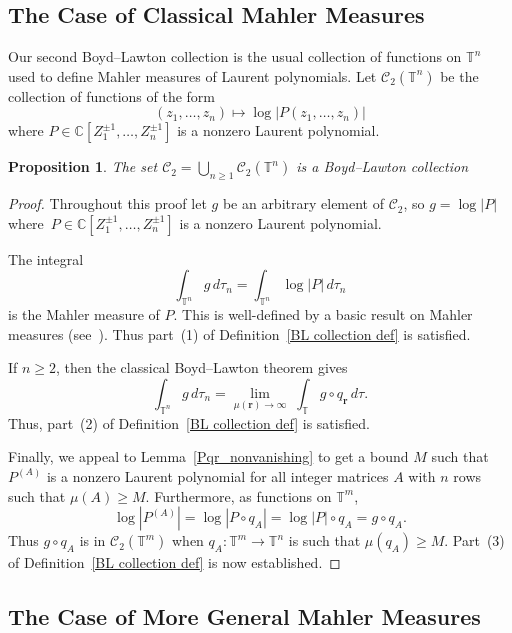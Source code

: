 \documentclass[12pt]{amsart}
\theoremstyle{plain}
\newtheorem{proposition}[theorem]{Proposition}
\theoremstyle{definition}
\theoremstyle{remark}
\numberwithin{theorem}{section}
\numberwithin{equation}{section} %
\newcommand{\bC}{{\mathbb{C}}}
\newcommand{\mc}{\mathcal}
\newcommand{\mb}{\mathbf}
\newcommand{\torus}{{\mathbb{T}}}
\begin{document}


\subsection{The Case of Classical Mahler Measures}

Our second Boyd--Lawton collection is the usual collection of functions on $\torus^n$ used to define Mahler measures of Laurent polynomials.
Let $\mc C_2 (\torus^n)$ be the collection of functions of the form
$$
(z_1, \ldots, z_n) \mapsto \log | P(z_1, \ldots, z_n) |
$$
where $P \in \bC\left[Z^{\pm 1}_1, \ldots, Z^{\pm 1}_n\right]$ is a nonzero Laurent polynomial.

\begin{proposition}\label{prop: C_2}
The set  $\mc C_2 = \bigcup_{n \ge 1} \mc C_2 (\torus^n)$ is a Boyd--Lawton collection
\end{proposition}

\begin{proof}
Throughout this proof let $g$ be an arbitrary element of $\mc C_2$, so $g = \log |P|$ where~$P \in \bC\left[Z^{\pm 1}_1, \ldots, Z^{\pm 1}_n\right]$ is a nonzero Laurent polynomial. 

The integral
$$
\int_{\torus^n}  g \, d\tau_n = \int_{\torus^n}  \log |P| \, d\tau_n 
$$
is the Mahler measure of $P$. This is well-defined by a basic result on Mahler measures (see~\cite[Proposition 3.1]{Brunault_Zudilin_2020}). 
Thus part~(1) of Definition~\ref{BL collection def} is satisfied. 


If $n\ge 2$, then the classical Boyd--Lawton theorem gives
$$
\int_{\torus^n}  g \, d\tau_n= \lim_{\mu(\mb r)\to \infty}\;  \int_\torus g \circ q_{\mb r} \, d \tau.
$$
Thus, part~(2) of Definition~\ref{BL collection def} is satisfied.

Finally, we appeal to Lemma~\ref{Pqr_nonvanishing} to get a bound $M$ such that $P^{(A)}$ is a nonzero Laurent polynomial for all
integer matrices $A$ with $n$ rows such that $\mu(A) \ge M$. Furthermore, as functions on $\torus^m$,
$$
\log \left| P^{(A)} \right| = \log \left | P \circ q_A \right| = \log |P| \circ q_A = g \circ q_A.
$$
Thus $g \circ q_A$ is in $\mc C_2(\torus^m)$ when $q_A \colon \torus^m \to \torus^n$ is such that $\mu\left( q_A \right) \ge M$. Part~(3) of Definition~\ref{BL collection def} is now established.
\end{proof}


\subsection{The Case of More General Mahler Measures}
\end{document}
